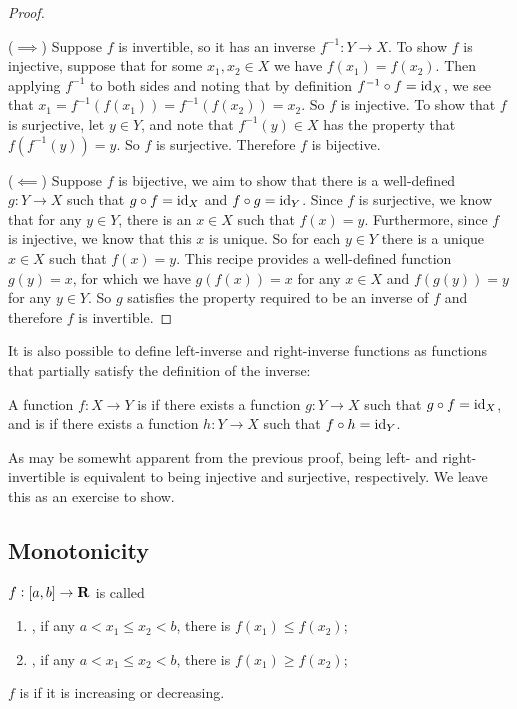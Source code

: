 \begin{proof} \

($\implies$) Suppose $f$ is invertible, so it has an inverse $f^{-1}: Y \to X$. To show $f$ is injective, suppose that for some $x_1, x_2 \in X$ we have $f(x_1) = f(x_2)$. Then applying $f^{-1}$ to both sides and noting that by definition $f^{-1} \circ f = \operatorname{id}_X$, we see that $x_1 = f^{-1}(f(x_1)) = f^{-1}(f(x_2)) = x_2$. So $f$ is injective. To show that $f$ is surjective, let $y \in Y$, and note that $f^{-1}(y) \in X$ has the property that $f(f^{-1}(y)) = y$. So $f$ is surjective. Therefore $f$ is bijective.

($\impliedby$) Suppose $f$ is bijective, we aim to show that there is a well-defined $g:Y \to X$ such that $g \circ f = \operatorname{id}_X$ and $f \circ g = \operatorname{id}_Y$. Since $f$ is surjective, we know that for any $y \in Y$, there is an $x \in X$ such that $f(x) = y$. Furthermore, since $f$ is injective, we know that this $x$ is unique. So for each $y \in Y$ there is a unique $x \in X$ such that $f(x) = y$. This recipe provides a well-defined function $g(y) = x$, for which we have $g(f(x)) = x$ for any $x \in X$ and $f(g(y)) = y$ for any $y \in Y$. So $g$ satisfies the property required to be an inverse of $f$ and therefore $f$ is invertible.
\end{proof}

It is also possible to define left-inverse and right-inverse functions as functions that partially satisfy the definition of the inverse:

\begin{definition}
A function $f:X \to Y$ is  if there exists a function $g:Y \to X$ such that $g \circ f = \operatorname{id}_X$, and is  if there exists a function $h: Y \to X$ such that $f \circ h = \operatorname{id}_Y$.
\end{definition}

As may be somewht apparent from the previous proof, being left- and right-invertible is equivalent to being injective and surjective, respectively. We leave this as an exercise to show.
\pagebreak

\subsection{Monotonicity}
\begin{definition}
$f:[a,b]\to\mathbf R$ is called
\begin{enumerate}[label=(\arabic*)]
\item {}, if any $a<x_1\le x_2<b$, there is $f(x_1)\le f(x_2)$;
\item {}, if any $a<x_1\le x_2<b$, there is $f(x_1)\ge f(x_2)$;
\end{enumerate}
$f$ is  if it is increasing or decreasing.
\end{definition}

